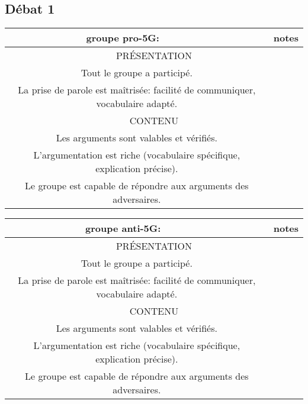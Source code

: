 \documentclass[a4paper,11pt]{article}
\begin{document}
\begin{Form}
\section*{Débat 1}
\begin{center}
\begin{tabular}{|c|p{10cm}|c|}
\hline 
groupe pro-5G: &  & notes \\ 
\hline 
\multicolumn{3}{|c|}{PRÉSENTATION}   \\ 
\hline 
\multicolumn{2}{|c|}{Tout le groupe a participé.} &  \\
\hline 
\multicolumn{2}{|c|}{La prise de parole est maîtrisée: facilité de communiquer, vocabulaire adapté.} &  \\
\hline 
\multicolumn{3}{|c|}{CONTENU}   \\ 
\hline 
\multicolumn{2}{|c|}{Les arguments sont valables et vérifiés.} &  \\
\hline 
\multicolumn{2}{|c|}{L’argumentation est riche (vocabulaire spécifique, explication précise).} &  \\ 
\hline 
\multicolumn{2}{|c|}{Le groupe est capable de répondre aux arguments des adversaires.} &  \\ 
\hline 
\end{tabular}
\end{center}

\begin{center}
\begin{tabular}{|c|p{10cm}|c|}
\hline 
groupe anti-5G: &  & notes \\ 
\hline 
\multicolumn{3}{|c|}{PRÉSENTATION}   \\ 
\hline 
\multicolumn{2}{|c|}{Tout le groupe a participé.} &  \\
\hline 
\multicolumn{2}{|c|}{La prise de parole est maîtrisée: facilité de communiquer, vocabulaire adapté.} &  \\
\hline 
\multicolumn{3}{|c|}{CONTENU}   \\ 
\hline 
\multicolumn{2}{|c|}{Les arguments sont valables et vérifiés.} &  \\
\hline 
\multicolumn{2}{|c|}{L’argumentation est riche (vocabulaire spécifique, explication précise).} &  \\ 
\hline 
\multicolumn{2}{|c|}{Le groupe est capable de répondre aux arguments des adversaires.} &  \\ 
\hline 
\end{tabular}
\end{center}


\end{Form}
\end{document}
